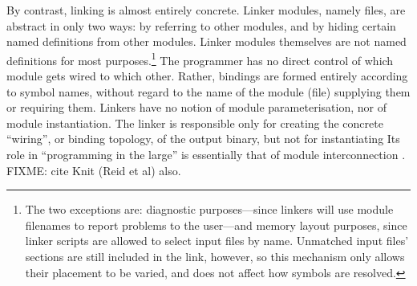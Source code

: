 By contrast, linking is almost entirely concrete.
Linker modules, namely files, 
are abstract in only two ways: by referring to other modules,
and by hiding certain named definitions from other modules.
Linker modules themselves are not named definitions for most purposes.\footnote{The 
two exceptions are: diagnostic purposes---since linkers will use 
module filenames to report problems to the user---and memory layout purposes,
since linker scripts are allowed to select input files by name.
Unmatched input files' sections are still included in the link, however, so
this mechanism only allows their placement to be varied, and does not affect
how symbols are resolved.}
The programmer has no direct control of which module gets wired to which other.
Rather, bindings are formed entirely according to symbol names,
without regard to the name of the module (file) supplying them or requiring them.
Linkers have no notion of module parameterisation, nor of module instantiation.
The linker is responsible only for creating the concrete ``wiring'', or binding topology, 
of the output binary, but not for instantiating
Its role in ``programming in the large'' is essentially that 
of module interconnection \citet{deremer_programming_1975}.
FIXME: cite Knit (Reid et al) also.


